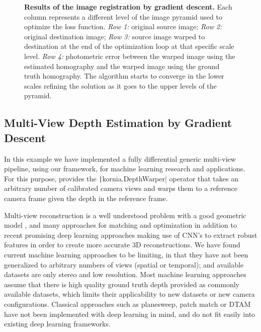 \begin{landscape}
\begin{figure}
\begin{center}
\begin{tabular}{c c c c c c}
        \end{tabular}
    \end{center}
    \caption[Results of the image registration by gradient descent]{{\bf Results of the image registration by gradient descent.} Each  column represents a different level of the image pyramid used to optimize the loss function. \textit{Row 1:}  original source image; \textit{Row 2:}  original destination image; \textit{Row 3:}  source image warped to destination at the end of the optimization loop at that specific scale level.\textit{ Row 4:}  photometric error between the warped image using the estimated homography and the warped image using the ground truth homography. The algorithm starts to converge in the lower scales refining the solution as it goes to the upper levels of the pyramid.}
    \label{fig:homography_pyramid}
\end{figure}
\end{landscape}

\label{section:use_cases:depth_estimation}
\subsection{Multi-View Depth Estimation by Gradient Descent}
%
In this example we have implemented a fully differential generic multi-view pipeline, using our framework,  for machine learning research and applications. For this purpose, \lib{} provides the \texttt|kornia.DepthWarper| operator that takes an arbitrary number of calibrated camera views and warps them to a reference camera frame given the depth in the reference frame.

Multi-view reconstruction is a well understood problem with a good geometric model \citep{Hartley_MVG}, and many approaches for matching and optimization \citep{dtam_Newcombe2011, patchmatch-stereo, Sevilla-LaraSJB16} in addition to recent promising deep learning approaches \citep{Luo2016} making use of CNN's to extract robust features in order to create more accurate 3D reconstructions. We have found current machine learning approaches \citep{FischerDIHHGSCB15, IlgMSKDB16} to be limiting, in that they have not been generalized to arbitrary numbers of views (spatial or temporal); and available datasets \citep{Butler2012, Geiger2012CVPR} are only stereo and low resolution. Most machine learning approaches assume that there is high quality ground truth depth provided as commonly available datasets, which limits
their applicability to new datasets or new camera configurations. Classical approaches such as planesweep, patch match or DTAM~\citep{Newcombe:2011:DDT:2355573.2356447} have not been implemented with deep learning in mind, and do not fit easily into existing deep learning frameworks.\\

